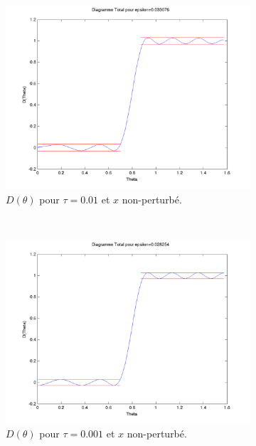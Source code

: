 \begin{figure}[h!]
  \centering
  \begin{subfigure}[b]{0.45\textwidth}
  \includegraphics[width=\textwidth]{D-ModRobust1-01.png}
  \caption{$D(\theta)$ pour $\tau = 0.01$ et $x$ non-perturbé.}
  \label{fig:D-ModRobust1-01}
  \end{subfigure}%
  ~ 
 \begin{subfigure}[b]{0.45\textwidth}
  \includegraphics[width=\textwidth]{D-ModRobust1-001.png}
  \caption{$D(\theta)$ pour $\tau = 0.001$ et $x$ non-perturbé.}
  \label{fig:D-ModRobust1-001}
  \end{subfigure}
 \begin{subfigure}[b]{0.45\textwidth}

\end{subfigure}
\end{figure}

